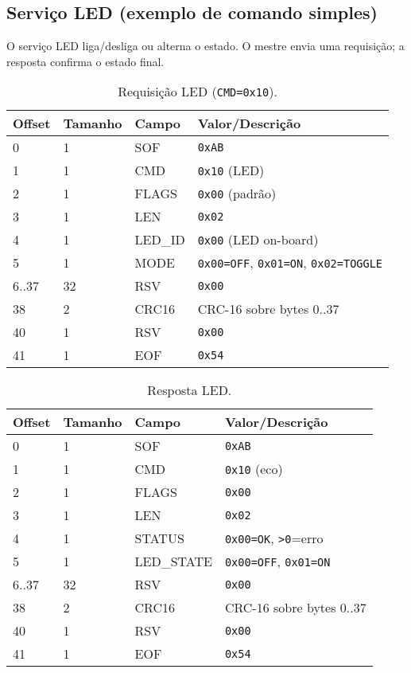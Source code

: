 \subsection*{Serviço LED (exemplo de comando simples)}

O serviço LED liga/desliga ou alterna o estado. O mestre envia uma requisição;
a resposta confirma o estado final.

\begin{table}[h]
  \centering
  \caption{Requisição LED (\texttt{CMD=0x10}).}
  \label{tab:spi-led-req}
  \setlength{\tabcolsep}{4pt}\footnotesize
  \begin{tabularx}{\textwidth}{lllX}
    \toprule
    Offset & Tamanho & Campo & Valor/Descrição \\
    \midrule
    0 & 1 & SOF & \texttt{0xAB} \\
    1 & 1 & CMD & \texttt{0x10} (LED) \\
    2 & 1 & FLAGS & \texttt{0x00} (padrão) \\
    3 & 1 & LEN & \texttt{0x02} \\
    4 & 1 & LED\_ID & \texttt{0x00} (LED on-board) \\
    5 & 1 & MODE & \texttt{0x00=OFF}, \texttt{0x01=ON}, \texttt{0x02=TOGGLE} \\
    6..37 & 32 & RSV & \texttt{0x00} \\
    38 & 2 & CRC16 & CRC-16 sobre bytes 0..37 \\
    40 & 1 & RSV & \texttt{0x00} \\
    41 & 1 & EOF & \texttt{0x54} \\
    \bottomrule
  \end{tabularx}
\end{table}

\begin{table}[h]
  \centering
  \caption{Resposta LED.}
  \label{tab:spi-led-rsp}
  \setlength{\tabcolsep}{4pt}\footnotesize
  \begin{tabularx}{\textwidth}{lllX}
    \toprule
    Offset & Tamanho & Campo & Valor/Descrição \\
    \midrule
    0 & 1 & SOF & \texttt{0xAB} \\
    1 & 1 & CMD & \texttt{0x10} (eco) \\
    2 & 1 & FLAGS & \texttt{0x00} \\
    3 & 1 & LEN & \texttt{0x02} \\
    4 & 1 & STATUS & \texttt{0x00=OK}, \texttt{\textgreater 0}=erro \\
    5 & 1 & LED\_STATE & \texttt{0x00=OFF}, \texttt{0x01=ON} \\
    6..37 & 32 & RSV & \texttt{0x00} \\
    38 & 2 & CRC16 & CRC-16 sobre bytes 0..37 \\
    40 & 1 & RSV & \texttt{0x00} \\
    41 & 1 & EOF & \texttt{0x54} \\
    \bottomrule
  \end{tabularx}
\end{table}

